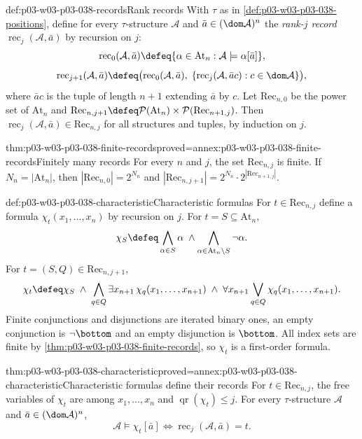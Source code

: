 \begin{hbdefinition}{def:p03-w03-p03-038-records}{Rank records}
With \(\tau\) as in \cref{def:p03-w03-p03-038-positions}, define for every
\(\tau\)-structure \(\mathcal A\) and \(\bar a\in(\dom\mathcal A)^n\) the
\emph{rank-\(j\) record} \(\operatorname{rec}_j(\mathcal A,\bar a)\) by
recursion on \(j\):
\[
 \operatorname{rec}_0(\mathcal A,\bar a)\defeq
   \{\alpha\in\mathrm{At}_n:\mathcal A\models\alpha[\bar a]\},
\]
\[
 \operatorname{rec}_{j+1}(\mathcal A,\bar a)\defeq
   \bigl(\operatorname{rec}_0(\mathcal A,\bar a),\;
   \{\operatorname{rec}_j(\mathcal A,\bar ac):c\in\dom\mathcal A\}\bigr),
\]
where \(\bar ac\) is the tuple of length \(n+1\) extending \(\bar a\) by
\(c\). Let \(\mathrm{Rec}_{n,0}\) be the power set of \(\mathrm{At}_n\)
and
\(\mathrm{Rec}_{n,j+1}\defeq\mathcal P(\mathrm{At}_n)\times
\mathcal P(\mathrm{Rec}_{n+1,j})\). Then
\(\operatorname{rec}_j(\mathcal A,\bar a)\in\mathrm{Rec}_{n,j}\) for all
structures and tuples, by induction on \(j\).
\end{hbdefinition}

\begin{hblemma}{thm:p03-w03-p03-038-finite-records}{proved=annex:p03-w03-p03-038-finite-records}{Finitely many records}
For every \(n\) and \(j\), the set \(\mathrm{Rec}_{n,j}\) is finite. If
\(N_n=|\mathrm{At}_n|\), then \(|\mathrm{Rec}_{n,0}|=2^{N_n}\) and
\(|\mathrm{Rec}_{n,j+1}|=2^{N_n}\cdot2^{|\mathrm{Rec}_{n+1,j}|}\).
\end{hblemma}

\begin{hbdefinition}{def:p03-w03-p03-038-characteristic}{Characteristic formulas}
For \(t\in\mathrm{Rec}_{n,j}\) define a formula
\(\chi_t(x_1,\ldots,x_n)\) by recursion on \(j\). For
\(t=S\subseteq\mathrm{At}_n\),
\[
 \chi_S\defeq\bigwedge_{\alpha\in S}\alpha\;\wedge
             \bigwedge_{\alpha\in\mathrm{At}_n\setminus S}\neg\alpha .
\]
For \(t=(S,Q)\in\mathrm{Rec}_{n,j+1}\),
\[
 \chi_t\defeq\chi_S\;\wedge\;
   \bigwedge_{q\in Q}\exists x_{n+1}\,\chi_q(x_1,\ldots,x_{n+1})
   \;\wedge\;
   \forall x_{n+1}\bigvee_{q\in Q}\chi_q(x_1,\ldots,x_{n+1}).
\]
Finite conjunctions and disjunctions are iterated binary ones, an empty
conjunction is \(\neg\bottom\) and an empty disjunction is \(\bottom\).
All index sets are finite by \cref{thm:p03-w03-p03-038-finite-records},
so \(\chi_t\) is a first-order formula.
\end{hbdefinition}

\begin{hblemma}{thm:p03-w03-p03-038-characteristic}{proved=annex:p03-w03-p03-038-characteristic}{Characteristic formulas define their records}
For \(t\in\mathrm{Rec}_{n,j}\), the free variables of \(\chi_t\) are among
\(x_1,\ldots,x_n\) and \(\operatorname{qr}(\chi_t)\le j\). For every
\(\tau\)-structure \(\mathcal A\) and \(\bar a\in(\dom\mathcal A)^n\),
\[
 \mathcal A\models\chi_t[\bar a]
 \iff
 \operatorname{rec}_j(\mathcal A,\bar a)=t .
\]
\end{hblemma}

